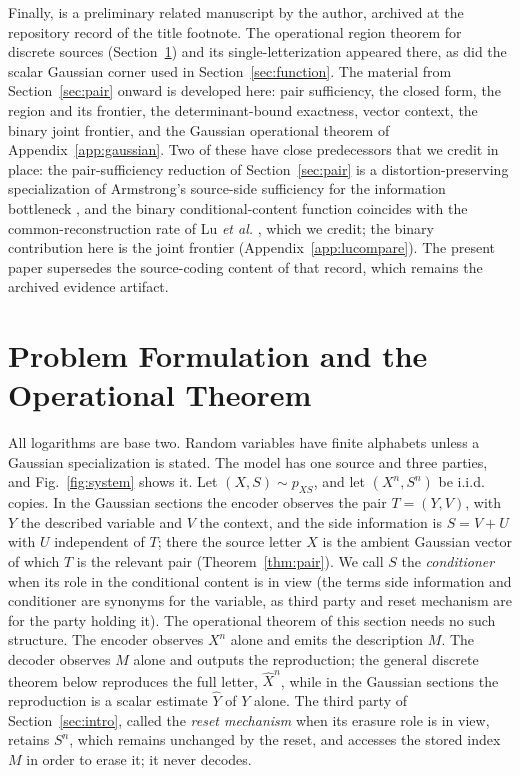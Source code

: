 ﻿\documentclass[11pt,onecolumn]{IEEEtran}
\newcommand{\hXn}{\widehat{X}^{n}}
\newcommand{\hY}{\widehat{Y}}
\begin{document}
Finally, \cite{bond2026landauer} is a preliminary related manuscript
by the author, archived at the repository record of the title
footnote. The operational region theorem for discrete sources
(Section~\ref{sec:operational}) and its single-letterization appeared
there, as did the scalar Gaussian corner used in
Section~\ref{sec:function}. The material from Section~\ref{sec:pair}
onward is developed here: pair sufficiency, the closed form, the region and
its frontier, the determinant-bound exactness, vector context, the
binary joint frontier, and the Gaussian operational theorem of
Appendix~\ref{app:gaussian}. Two of these have close predecessors that we
credit in place: the pair-sufficiency reduction of Section~\ref{sec:pair}
is a distortion-preserving specialization of Armstrong's source-side
sufficiency for the information bottleneck \cite{armstrong2026}, and the
binary conditional-content function coincides with the common-reconstruction
rate of Lu \emph{et al.} \cite{lu2016lossy}, which we credit; the binary
contribution here is the joint frontier (Appendix~\ref{app:lucompare}). The present paper supersedes the
source-coding content of that record, which remains the archived
evidence artifact.

\section{Problem Formulation and the Operational Theorem}
\label{sec:operational}

All logarithms are base two. Random variables have finite alphabets unless a
Gaussian specialization is stated. The model has one source and three
parties, and Fig.~\ref{fig:system} shows it. Let $(X,S)\sim p_{XS}$, and let
$(X^n,S^n)$ be i.i.d. copies. In the Gaussian sections the encoder observes
the pair $T=(Y,V)$, with $Y$ the described variable and $V$ the context, and
the side information is $S=V+U$ with $U$ independent of $T$; there the
source letter $X$ is the ambient Gaussian vector of which $T$ is the
relevant pair (Theorem~\ref{thm:pair}). We call $S$
the \emph{conditioner} when its role in the conditional content is in
view (the terms side information and conditioner are synonyms for the
variable, as third party and reset mechanism are for the party holding
it). The operational
theorem of this section needs no such structure. The encoder observes $X^n$
alone and emits the description $M$. The decoder observes $M$ alone and
outputs the reproduction; the general discrete theorem below reproduces the
full letter, $\hXn$, while in the Gaussian sections the reproduction is a
scalar estimate $\hY$ of $Y$ alone. The third party of
Section~\ref{sec:intro}, called the \emph{reset mechanism} when its
erasure role is in view, retains
$S^n$, which remains unchanged by the reset, and accesses the stored
index $M$ in order to erase it; it never decodes.
\end{document}
